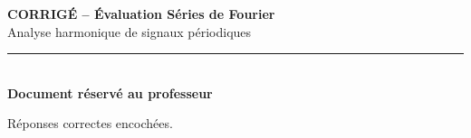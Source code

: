 \documentclass[a4paper,11pt]{article}
\begin{document}
\begin{center}
  {\LARGE \textbf{CORRIGÉ -- Évaluation Séries de Fourier}} \\[0.2cm]
  {\Large Analyse harmonique de signaux périodiques} \\[0.2cm]
  \rule{0.6\textwidth}{0.4pt} \\[0.15cm]
  \textcolor{vertcorr}{\textbf{Document réservé au professeur}}
\end{center}

\vspace{0.4cm}

\begin{tcolorbox}[qcmbox={Exercice 1 \, -- \, QCM \hfill \normalfont\textit{(5 points)}}]
  Réponses correctes encochées.
\end{tcolorbox}

\vspace{0.2cm}
\end{document}
